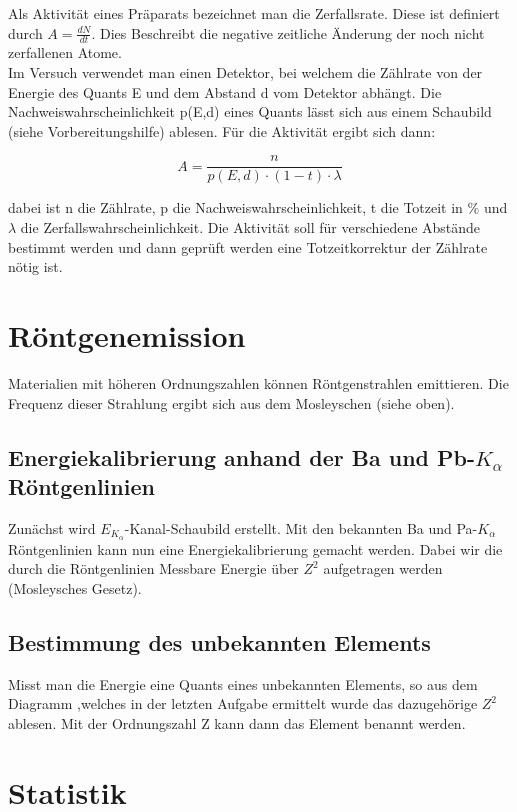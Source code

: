 \documentclass[a4paper,titlepage]{scrartcl}
\numberwithin{equation}{section}
\begin{document}
Als Aktivität eines Präparats bezeichnet man die Zerfallsrate. Diese ist definiert durch $ A =  \frac{dN}{dt}$. Dies Beschreibt die negative zeitliche Änderung der noch nicht zerfallenen Atome.\\
Im Versuch verwendet man einen Detektor, bei welchem die Zählrate von der Energie des Quants E und dem Abstand d vom Detektor abhängt. Die Nachweiswahrscheinlichkeit p(E,d) eines Quants lässt sich aus einem Schaubild (siehe Vorbereitungshilfe) ablesen. Für die Aktivität ergibt sich dann:

\begin{equation*}
A = \frac{n}{p(E,d) \cdot (1-t)\cdot \lambda}
\end{equation*}

dabei ist n die Zählrate, p die Nachweiswahrscheinlichkeit, t die Totzeit in $\%$ und $\lambda$ die Zerfallswahrscheinlichkeit. Die Aktivität soll für verschiedene Abstände bestimmt werden und dann geprüft werden eine Totzeitkorrektur der Zählrate nötig ist.

\section{Röntgenemission}
 Materialien mit höheren Ordnungszahlen können Röntgenstrahlen emittieren. Die Frequenz dieser Strahlung  ergibt sich aus dem Mosleyschen (siehe oben).
 
\subsection{Energiekalibrierung anhand der Ba und Pb-$K_{\alpha}$ Röntgenlinien}
Zunächst wird $E_{K_{\alpha}}$-Kanal-Schaubild erstellt. Mit den bekannten Ba und Pa-$K_{\alpha}$ Röntgenlinien kann nun eine Energiekalibrierung gemacht werden. Dabei wir die durch die Röntgenlinien Messbare Energie über $Z^2$ aufgetragen werden (Mosleysches Gesetz).
\subsection{Bestimmung des unbekannten Elements}
Misst man die Energie eine Quants eines unbekannten Elements, so aus dem Diagramm ,welches in der letzten Aufgabe ermittelt wurde das dazugehörige $Z^2$ ablesen. Mit der Ordnungszahl Z kann dann das Element benannt werden.
\section{Statistik}
\end{document}
